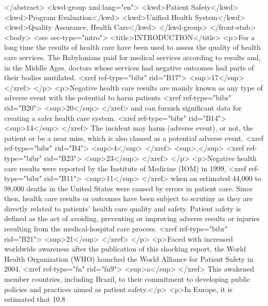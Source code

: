       </abstract>
      <kwd-group xml:lang="en">
        <kwd>Patient Safety</kwd>
        <kwd>Program Evaluation</kwd>
        <kwd>Unified Health System</kwd>
        <kwd>Quality Assurance, Health Care</kwd>
      </kwd-group>
    </front-stub>
    <body>
      <sec sec-type="intro">
        <title>INTRODUCTION</title>
        <p>For a long time the results of health care have been used to assess the quality of health
          care services. The Babylonians paid for medical services according to results and, in the
          Middle Ages, doctors whose services had negative outcomes had parts of their bodies
          mutilated. <xref ref-type="bibr" rid="B17">
            <sup>17</sup>
          </xref>
        </p>
        <p>Negative health care results are mainly known as any type of adverse event with the
          potential to harm patients <xref ref-type="bibr" rid="B20">
            <sup>20</sup>
          </xref> and can furnish significant data for creating a safer health care system. <xref
            ref-type="bibr" rid="B14">
            <sup>14</sup>
          </xref> The incident may harm (adverse event), or not, the patient or be a near miss,
          which is also classed as a potential adverse event. <xref ref-type="bibr" rid="B4">
            <sup>4</sup>
          </xref>
          <sup>,</sup>
          <xref ref-type="bibr" rid="B23">
            <sup>23</sup>
          </xref>
        </p>
        <p>Negative health care results were reported by the Institute of Medicine (IOM) in 1999,
            <xref ref-type="bibr" rid="B11">
            <sup>11</sup>
          </xref> when an estimated 44,000 to 98,000 deaths in the United States were caused by
          errors in patient care. Since then, health care results or outcomes have been subject to
          scrutiny as they are directly related to patients’ health care quality and safety. Patient
          safety is defined as the act of avoiding, preventing or improving adverse results or
          injuries resulting from the medical-hospital care process. <xref ref-type="bibr" rid="B21">
            <sup>21</sup>
          </xref>
        </p>
        <p>Faced with increased worldwide awareness after the publication of this shocking report,
          the World Health Organization (WHO) launched the World Alliance for Patient Safety in
          2004. <xref ref-type="fn" rid="fn9">
            <sup>a</sup>
          </xref> This awakened member countries, including Brazil, to their commitment to
          developing public policies and practices aimed as patient safety.</p>
        <p>In Europe, it is estimated that 10.8%
